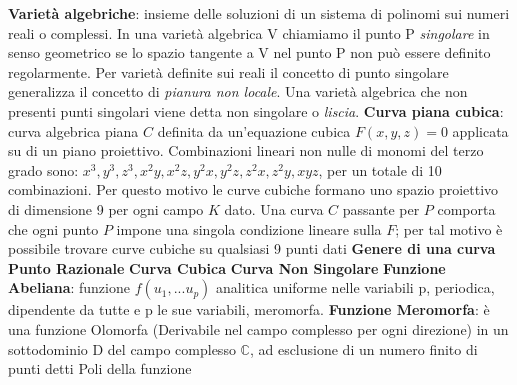 \documentclass[a4paper,12pt]{tesiinfo}
\begin{document}
\newline\newline
\textbf{Varietà algebriche}: insieme delle soluzioni di un sistema di polinomi sui numeri reali o complessi. In una variet\`a algebrica V chiamiamo il punto P \textit{singolare} in senso geometrico se lo spazio tangente a V nel punto P non pu\`o essere definito regolarmente. Per variet\`a definite sui reali il concetto di punto singolare generalizza il concetto di \textit{pianura non locale}. Una variet\`a algebrica che non presenti punti singolari viene detta non singolare o \textit{liscia}.
\newline\newline
\textbf{Curva piana cubica}: curva algebrica piana $C$ definita da un'equazione cubica $F(x, y, z) = 0$ applicata su di un piano proiettivo. Combinazioni lineari non nulle di monomi del terzo grado sono: $x^3, y^3, z^3, x^2y, x^2z, y^2x, y^2z, z^2x, z^2y, xyz$, per un totale di 10 combinazioni. Per questo motivo le curve cubiche formano uno spazio proiettivo di dimensione 9 per ogni campo $K$ dato.
Una curva $C$ passante per $P$ comporta che ogni punto $P$ impone una singola condizione lineare sulla $F$; per tal motivo \`e possibile trovare curve cubiche su qualsiasi 9 punti dati
\newline\newline
\textbf{Genere di una curva}
\newline\newline
\textbf{Punto Razionale}
\newline\newline
\textbf{Curva Cubica}
\newline\newline
\textbf{Curva Non Singolare}
\newline\newline
\textbf{Funzione Abeliana}: funzione $f(u_1, ... u_p)$ analitica uniforme nelle variabili p, periodica, dipendente da tutte e p le sue variabili, meromorfa.
\newline\newline
\textbf{Funzione Meromorfa}: \`e una funzione Olomorfa (Derivabile nel campo complesso per ogni direzione) in un sottodominio D del campo complesso $\mathbb{C}$, ad esclusione di un numero finito di punti detti Poli della funzione\newline\newline
\end{document}
